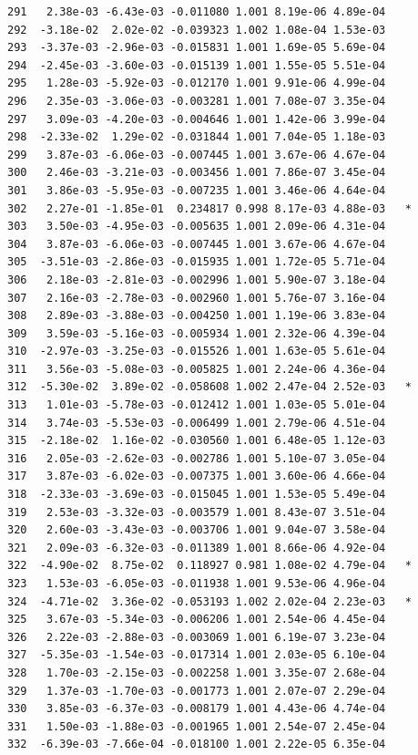 \documentclass[
  letterpaper,
  DIV=11,
  numbers=noendperiod]{scrartcl}
\begin{document}
\begin{verbatim}
291   2.38e-03 -6.43e-03 -0.011080 1.001 8.19e-06 4.89e-04    
292  -3.18e-02  2.02e-02 -0.039323 1.002 1.08e-04 1.53e-03    
293  -3.37e-03 -2.96e-03 -0.015831 1.001 1.69e-05 5.69e-04    
294  -2.45e-03 -3.60e-03 -0.015139 1.001 1.55e-05 5.51e-04    
295   1.28e-03 -5.92e-03 -0.012170 1.001 9.91e-06 4.99e-04    
296   2.35e-03 -3.06e-03 -0.003281 1.001 7.08e-07 3.35e-04    
297   3.09e-03 -4.20e-03 -0.004646 1.001 1.42e-06 3.99e-04    
298  -2.33e-02  1.29e-02 -0.031844 1.001 7.04e-05 1.18e-03    
299   3.87e-03 -6.06e-03 -0.007445 1.001 3.67e-06 4.67e-04    
300   2.46e-03 -3.21e-03 -0.003456 1.001 7.86e-07 3.45e-04    
301   3.86e-03 -5.95e-03 -0.007235 1.001 3.46e-06 4.64e-04    
302   2.27e-01 -1.85e-01  0.234817 0.998 8.17e-03 4.88e-03   *
303   3.50e-03 -4.95e-03 -0.005635 1.001 2.09e-06 4.31e-04    
304   3.87e-03 -6.06e-03 -0.007445 1.001 3.67e-06 4.67e-04    
305  -3.51e-03 -2.86e-03 -0.015935 1.001 1.72e-05 5.71e-04    
306   2.18e-03 -2.81e-03 -0.002996 1.001 5.90e-07 3.18e-04    
307   2.16e-03 -2.78e-03 -0.002960 1.001 5.76e-07 3.16e-04    
308   2.89e-03 -3.88e-03 -0.004250 1.001 1.19e-06 3.83e-04    
309   3.59e-03 -5.16e-03 -0.005934 1.001 2.32e-06 4.39e-04    
310  -2.97e-03 -3.25e-03 -0.015526 1.001 1.63e-05 5.61e-04    
311   3.56e-03 -5.08e-03 -0.005825 1.001 2.24e-06 4.36e-04    
312  -5.30e-02  3.89e-02 -0.058608 1.002 2.47e-04 2.52e-03   *
313   1.01e-03 -5.78e-03 -0.012412 1.001 1.03e-05 5.01e-04    
314   3.74e-03 -5.53e-03 -0.006499 1.001 2.79e-06 4.51e-04    
315  -2.18e-02  1.16e-02 -0.030560 1.001 6.48e-05 1.12e-03    
316   2.05e-03 -2.62e-03 -0.002786 1.001 5.10e-07 3.05e-04    
317   3.87e-03 -6.02e-03 -0.007375 1.001 3.60e-06 4.66e-04    
318  -2.33e-03 -3.69e-03 -0.015045 1.001 1.53e-05 5.49e-04    
319   2.53e-03 -3.32e-03 -0.003579 1.001 8.43e-07 3.51e-04    
320   2.60e-03 -3.43e-03 -0.003706 1.001 9.04e-07 3.58e-04    
321   2.09e-03 -6.32e-03 -0.011389 1.001 8.66e-06 4.92e-04    
322  -4.90e-02  8.75e-02  0.118927 0.981 1.08e-02 4.79e-04   *
323   1.53e-03 -6.05e-03 -0.011938 1.001 9.53e-06 4.96e-04    
324  -4.71e-02  3.36e-02 -0.053193 1.002 2.02e-04 2.23e-03   *
325   3.67e-03 -5.34e-03 -0.006206 1.001 2.54e-06 4.45e-04    
326   2.22e-03 -2.88e-03 -0.003069 1.001 6.19e-07 3.23e-04    
327  -5.35e-03 -1.54e-03 -0.017314 1.001 2.03e-05 6.10e-04    
328   1.70e-03 -2.15e-03 -0.002258 1.001 3.35e-07 2.68e-04    
329   1.37e-03 -1.70e-03 -0.001773 1.001 2.07e-07 2.29e-04    
330   3.85e-03 -6.37e-03 -0.008179 1.001 4.43e-06 4.74e-04    
331   1.50e-03 -1.88e-03 -0.001965 1.001 2.54e-07 2.45e-04    
332  -6.39e-03 -7.66e-04 -0.018100 1.001 2.22e-05 6.35e-04    

\end{verbatim}
\end{document}
